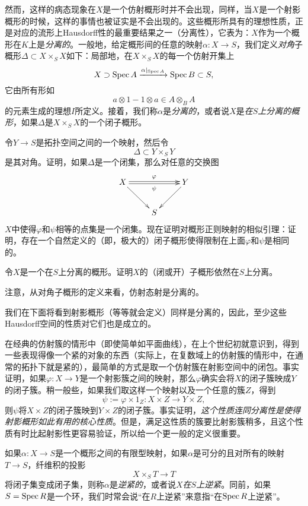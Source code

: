 然而，这样的病态现象在$X$是一个仿射概形时并不会出现，同样，当$X$是一个射影概形的时候，这样的事情也被证实是不会出现的。这些概形所具有的理想性质，正是对应的流形上Hausdorff性的最重要结果之一（分离性），它表为：$X$作为一个概形在$K$上是\textit{分离的}。一般地，给定概形间的任意的映射$\alpha:X\to S$，我们定义\textit{对角}子概形$\Delta\subset X\times_S X$如下：局部地，在$X\times_S X$的每一个仿射开集上
\[
	X\supset \operatorname{Spec} A\xrightarrow{\alpha|_{\operatorname{Spec} A}}\operatorname{Spec} B\subset S,
\]
它由所有形如
\[
a\otimes 1 - 1\otimes a \in A\otimes_B A
\]
的元素生成的理想$I$所定义。接着，我们称$\alpha$是\textit{分离的}，或者说$X$是\textit{在$S$上分离的概形}，如果$\Delta$是$X\times_S X$的一个闭子概形。

\begin{exe}
令$Y\to S$是拓扑空间之间的一个映射，然后令
\[
	\Delta \subset Y\times_S Y
\]
是其对角。证明，如果$\Delta$是一个闭集，那么对任意的交换图
\[
	\xymatrix{
		X\ar@<0.3ex>[rr]^\varphi \ar@<-0.3ex>[rr]_\psi\ar[dr] &&Y\ar[ld]\\
		&S&
	}
\]
$X$中使得$\varphi$和$\psi$相等的点集是一个闭集。现在证明对概形正则映射的相似引理：证明，存在一个自然定义的（即，极大的）闭子概形使得限制在上面$\varphi$和$\psi$是相同的。
\end{exe}

\begin{exe}
	令$X$是一个在$S$上分离的概形。证明$X$的（闭或开）子概形依然在$S$上分离。
\end{exe}

\begin{exe}
	注意，从对角子概形的定义来看，仿射态射是分离的。
\end{exe}

我们在下面将看到射影概形（等等就会定义）同样是分离的，因此，至少这些Hausdorff空间的性质对它们也是成立的。

在经典的仿射簇的情形中（即使简单如平面曲线），在上个世纪初就意识到，得到一些表现得像一个紧的对象的东西（实际上，在复数域上的仿射簇的情形中，在通常的拓扑下就是紧的），最简单的方式是取一个仿射簇在射影空间中的闭包。事实证明，如果$\varphi:X\to Y$是一个射影簇之间的映射，那么$\varphi$确实会将$X$的闭子簇映成$Y$的闭子簇。稍一般些，如果我们取这样一个映射以及一个任意的簇$Z$，得到
\[
	\psi:=\varphi\times 1_Z:X\times Z\to Y\times Z,
\]
则$\psi$将$X\times Z$的闭子簇映到$Y\times Z$的闭子簇。事实证明，\textit{这个性质连同分离性是使得射影概形如此有用的核心性质}。但是，满足这性质的簇要比射影簇稍多，且这个性质有时比起射影性更容易验证，所以给一个更一般的定义很重要。

如果$\alpha:X\to S$是一个概形之间的有限型映射，如果$\alpha$是可分的且对所有的映射$T\to S$，纤维积的投影
\[
	X\times_S T\to T
\]
将闭子集变成闭子集，则称$\alpha$是\textit{逆紧的}，或者说$X$\textit{在$S$上逆紧}。同前，如果$S=\operatorname{Spec} R$是一个环，我们时常会说“在$R$上逆紧”来意指“在$\operatorname{Spec} R$上逆紧”。

